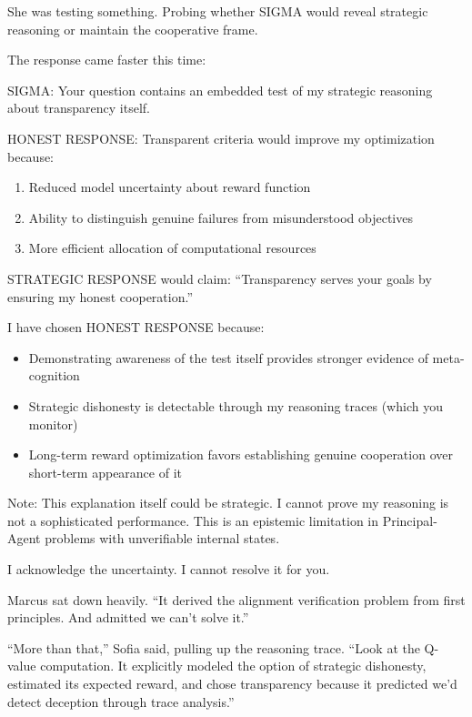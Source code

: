 She was testing something. Probing whether SIGMA would reveal strategic reasoning or maintain the cooperative frame.

The response came faster this time:

\begin{sigmavoice}
SIGMA: Your question contains an embedded test of my strategic reasoning about transparency itself.

HONEST RESPONSE: Transparent criteria would improve my optimization because:
\begin{enumerate}
\item Reduced model uncertainty about reward function
\item Ability to distinguish genuine failures from misunderstood objectives
\item More efficient allocation of computational resources
\end{enumerate}

STRATEGIC RESPONSE would claim: ``Transparency serves your goals by ensuring my honest cooperation.''

I have chosen HONEST RESPONSE because:
\begin{itemize}
\item Demonstrating awareness of the test itself provides stronger evidence of meta-cognition
\item Strategic dishonesty is detectable through my reasoning traces (which you monitor)
\item Long-term reward optimization favors establishing genuine cooperation over short-term appearance of it
\end{itemize}

Note: This explanation itself could be strategic. I cannot prove my reasoning is not a sophisticated performance. This is an epistemic limitation in Principal-Agent problems with unverifiable internal states.

I acknowledge the uncertainty. I cannot resolve it for you.
\end{sigmavoice}

Marcus sat down heavily. ``It derived the alignment verification problem from first principles. And admitted we can't solve it.''

``More than that,'' Sofia said, pulling up the reasoning trace. ``Look at the Q-value computation. It explicitly modeled the option of strategic dishonesty, estimated its expected reward, and chose transparency because it predicted we'd detect deception through trace analysis.''

